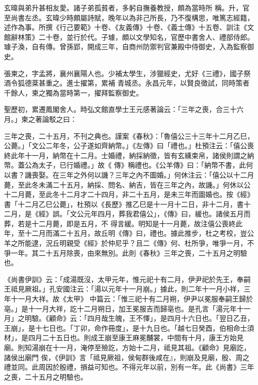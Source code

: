 \begin{pinyinscope}
 玄暐與弟升甚相友愛。諸子弟孤貧者，多躬自撫養教授，頗為當時所
 稱。升，官至尚書左丞。玄暐少時頗屬詩賦，晚年以為非己所長，乃不復構思，唯篤志經籍，述作為事。所撰《行己要範》十卷、《友義傳》十卷、《義士傳》十五卷、訓注《文館辭林策》二十卷，並行於代。子璩，頗以文學知名，官歷中書舍人、禮部侍郎。璩子渙，自有傳。曾孫郢，開成三年，自商州防禦判官兼殿中侍御史，入為監察御史。



 張柬之，字孟將，襄州襄陽人也。少補太學生，涉獵經史，尤好《三禮》，國子祭酒令狐德棻甚重之。進士擢第，累補
 青城丞。永昌元年，以賢良徵試，同時策者千餘人，柬之獨為當時第一，擢拜監察御史。



 聖歷初，累遷鳳閣舍人。時弘文館直學士王元感著論云：「三年之喪，合三十六月。」柬之著論駁之曰：



 三年之喪，二十五月，不刊之典也。謹案《春秋》：「魯僖公三十三年十二月乙巳，公薨。」「文公二年冬，公子遂如齊納幣。」《左傳》曰「禮也。」杜預注云：「僖公喪終此年十一月，納幣在十二月。士婚禮，納採納徵，皆有玄纁束帛，諸侯則謂之納幣。蓋公為太子，已行婚禮。」故《
 傳》稱禮也。《公羊傳》曰：「納幣不書，此何以書？譏喪娶。在三年之外何以譏？三年之內不圖婚。」何休注云：「僖公以十二月薨，至此冬未滿二十五月，納採、問名、納吉，皆在三年之內，故譏。」何休以公十二月薨，至此冬十二月才二十四月，非二十五月，是未三年而圖婚也。按《經》書「十二月乙巳公薨」，杜預以《長歷》推乙巳是十一月十二日，非十二月，書十二月，是《經》誤。「文公元年四月，葬我君僖公」，《傳》曰，緩也。諸侯五月而葬，若是十二月薨，即是五月，不
 得言緩。明知是十一月薨，故注僖公喪終此年，至十二月而滿二十五月，故丘明《傳》曰，禮也。據此推步，杜之考校，豈公羊之所能逮，況丘明親受《經》於仲尼乎？且二《傳》何、杜所爭，唯爭一月，不爭一年。其二十五月除喪，由來無別。此則《春秋》三年之喪，二十五月之明驗也。



 《尚書伊訓》云：「成湯既沒，太甲元年，惟元祀十有二月，伊尹祀於先王，奉嗣王祗見厥祖。」孔安國注云：「湯以元年十一月崩。」據此，則二年十一月小祥，三年十一月大祥。故《太甲》
 中篇云：「惟三祀十有二月朔，伊尹以冕服奉嗣王歸於亳。」是十一月大祥，訖十二月朔日，加王冕服吉而歸亳也。是孔言「湯元年十一月」之明驗。《顧命》云：「四月哉生魄，王不懌」，是四月十六日也。「翌日乙丑，王崩」，是十七日也。「丁卯，命作冊度」，是十九日也。「越七日癸酉，伯相命士須材」，是四月二十五日也。則成王崩至康王麻冕黼裳，中間有十月，康王方始見廟。則知湯崩在十一月，淹停至殮訖，方始十二月，祗見其祖。《顧命》見廟訖，諸侯出廟門
 俟，《伊訓》言「祗見厥祖，侯甸群後咸在』，則崩及見廟，殷、周之禮並同。此周因於殷禮，損益可知也。不得元年以前，別有一年。此《尚書》三年之喪，二十五月之明驗也。




\end{pinyinscope}
